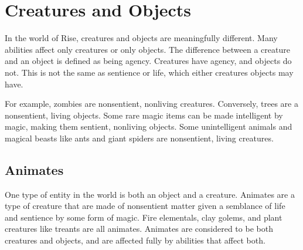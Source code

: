\section{Creatures and Objects}
    In the world of Rise, creatures and objects are meaningfully different.
    Many abilities affect only creatures or only objects.
    The difference between a creature and an object is defined as being agency.
    Creatures have agency, and objects do not.
    This is not the same as sentience or life, which either creatures objects may have.

    For example, zombies are nonsentient, nonliving creatures.
    Conversely, trees are a nonsentient, living objects.
    Some rare magic items can be made intelligent by magic, making them sentient, nonliving objects.
    Some unintelligent animals and magical beasts like ants and giant spiders are nonsentient, living creatures.

    \subsection{Animates}
        One type of entity in the world is both an object and a creature.
        Animates are a type of creature that are made of nonsentient matter given a semblance of life and sentience by some form of magic.
        Fire elementals, clay golems, and plant creatures like treants are all animates.
        Animates are considered to be both creatures and objects, and are affected fully by abilities that affect both.

